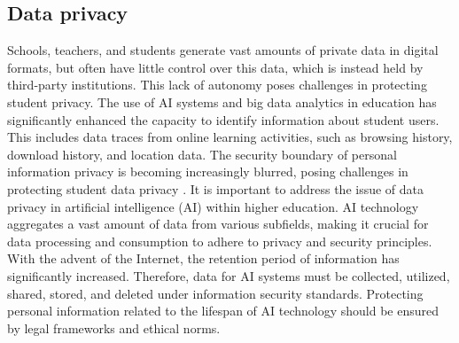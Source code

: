 
\subsection{Data privacy}
Schools, teachers, and students generate vast amounts of private data in digital formats,
but often have little control over this data, which is instead held by third-party institutions. This
lack of autonomy poses challenges in protecting student privacy. The use of AI systems and big
data analytics in education has significantly enhanced the capacity to identify information about
student users. This includes data traces from online learning activities, such as browsing history,
download history, and location data. The security boundary of personal information privacy is 
becoming increasingly blurred, posing challenges in protecting student data privacy \citep{huang_ethics_2023}. 
It is important to address the issue  of data privacy in artificial intelligence (AI) within higher 
education. AI technology aggregates a vast amount of data from various subfields, 
making it crucial for data processing and consumption to adhere to privacy and security principles.
With the advent of the Internet, the retention period  of information has significantly increased. 
Therefore, data for AI systems must be collected, utilized,  shared, stored, and deleted under information 
security standards. Protecting personal information related to the lifespan of AI technology
should be ensured by legal frameworks and ethical norms\citep{unesco_2022}.

